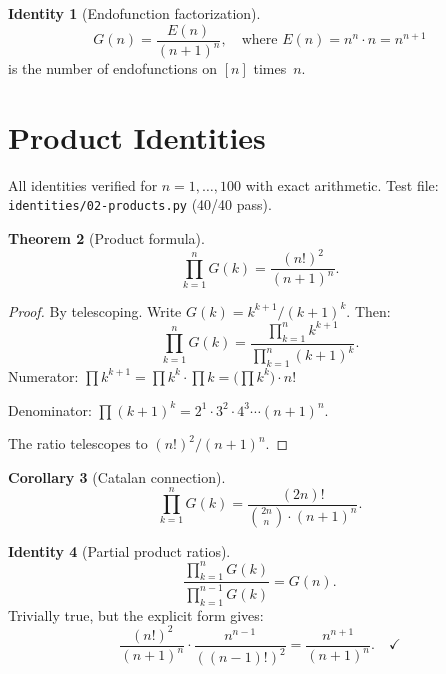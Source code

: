 \documentclass[11pt,a4paper]{article}
\newtheorem{theorem}{Theorem}[section]
\newtheorem{corollary}[theorem]{Corollary}
\theoremstyle{definition}
\newtheorem{identity}[theorem]{Identity}
\theoremstyle{remark}
\begin{document}
\begin{identity}[Endofunction factorization]\label{id:endo}
\begin{equation}\label{eq:endo}
  G(n) = \frac{E(n)}{(n+1)^{n}},\quad\text{where } E(n)=n^{n}\cdot n = n^{n+1}
\end{equation}
is the number of endofunctions on $[n]$ times~$n$.
\end{identity}

\section{Product Identities}\label{sec:product}

All identities verified for $n=1,\ldots,100$ with exact arithmetic. Test file: \texttt{identities/02-products.py} (40/40 pass).

\begin{theorem}[Product formula]\label{thm:product}
\begin{equation}\label{eq:product}
  \prod_{k=1}^{n} G(k) = \frac{(n!)^{2}}{(n+1)^{n}}.
\end{equation}
\end{theorem}

\begin{proof}
By telescoping. Write $G(k) = k^{k+1}/(k+1)^{k}$. Then:
\[
  \prod_{k=1}^{n}G(k) = \frac{\prod_{k=1}^{n}k^{k+1}}{\prod_{k=1}^{n}(k+1)^{k}}.
\]
Numerator: $\prod k^{k+1} = \prod k^{k}\cdot\prod k = \bigl(\prod k^{k}\bigr)\cdot n!$

Denominator: $\prod (k+1)^{k} = 2^{1}\cdot 3^{2}\cdot 4^{3}\cdots(n+1)^{n}$.

The ratio telescopes to $(n!)^{2}/(n+1)^{n}$.
\end{proof}

\begin{corollary}[Catalan connection]\label{cor:catalan}
\begin{equation}\label{eq:catalan}
  \prod_{k=1}^{n}G(k) = \frac{(2n)!}{\binom{2n}{n}\cdot(n+1)^{n}}.
\end{equation}
\end{corollary}

\begin{identity}[Partial product ratios]\label{id:partial}
\begin{equation}\label{eq:partial}
  \frac{\prod_{k=1}^{n}G(k)}{\prod_{k=1}^{n-1}G(k)} = G(n).
\end{equation}
Trivially true, but the explicit form gives:
\[
  \frac{(n!)^{2}}{(n+1)^{n}}\cdot\frac{n^{n-1}}{((n-1)!)^{2}} = \frac{n^{n+1}}{(n+1)^{n}}.\quad\checkmark
\]
\end{identity}
\end{document}
